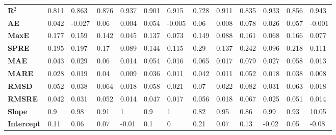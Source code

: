 \begin{landscape}
\begin{table}[t]
{\begin{tabular}{ 	p{2.5cm}|p{1.1cm}p{1.1cm}|p{1.1cm}p{1.1cm}|p{1.1cm}p{1.1cm}|p{1.1cm}p{1.1cm}|p{1.1cm}p{1.1cm}|p{1.1cm}p{1.1cm} }
		\hline
		\textbf{R$^2$} & 0.811           & 0.863           & 0.876           & 0.937           & 0.901            & 0.915           & 0.728            & 0.911           & 0.835            & 0.933            & 0.856            & 0.943           \\
		\textbf{AE}                  & 0.042           & -0.027          & 0.06            & 0.004           & 0.054            & -0.005          & 0.06             & 0.008           & 0.078            & 0.026            & 0.057            & -0.001          \\
		\textbf{MaxE}                & 0.177           & 0.159           & 0.142           & 0.045           & 0.137            & 0.073           & 0.149            & 0.088           & 0.161            & 0.068            & 0.166            & 0.077           \\
		\textbf{SPRE}                & 0.195           & 0.197           & 0.17            & 0.089           & 0.144            & 0.115           & 0.29             & 0.137           & 0.242            & 0.096            & 0.218            & 0.111           \\
		\textbf{MAE}                 & 0.043           & 0.029           & 0.06            & 0.014           & 0.054            & 0.016           & 0.065            & 0.017           & 0.079            & 0.027            & 0.058            & 0.013           \\
		\textbf{MARE}                & 0.028           & 0.019           & 0.04            & 0.009           & 0.036            & 0.011           & 0.042            & 0.011           & 0.052            & 0.018            & 0.038            & 0.008           \\
		\textbf{RMSD}                & 0.052           & 0.038           & 0.064           & 0.018           & 0.058            & 0.021           & 0.07             & 0.022           & 0.082            & 0.031            & 0.063            & 0.018           \\
		\textbf{RMSRE}               & 0.042           & 0.031           & 0.052           & 0.014           & 0.047            & 0.017           & 0.056            & 0.018           & 0.067            & 0.025            & 0.051            & 0.014           \\
		\textbf{Slope}               & 0.9             & 0.98            & 0.91            & 1               & 0.9              & 1               & 0.82             & 0.95            & 0.86             & 0.99             & 0.93             & 10.05            \\
		\textbf{Intercept}           & 0.11            & 0.06            & 0.07            & -0.01           & 0.1              & 0               & 0.21             & 0.07            & 0.13             & -0.02            & 0.05             & -0.08          
	\end{tabular}}
\end{table}
\end{landscape}

